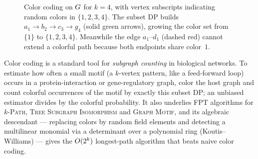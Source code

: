 \begin{figure}[H]
\centering
{}
\caption{Color coding on $G$ for $k=4$, with vertex subscripts indicating random colors in $\{1,2,3,4\}$. The subset DP builds $a_1 \to b_2 \to c_3 \to g_4$ (solid green arrows), growing the color set from $\{1\}$ to $\{1,2,3,4\}$. Meanwhile the edge $a_1\text{--}d_1$ (dashed red) cannot extend a colorful path because both endpoints share color~$1$.}
\label{ch25:fig-color-coding}
\end{figure}

\begin{applicationbox}
Color coding is a standard tool for \emph{subgraph counting} in biological networks. To estimate how often a small motif (a $k$-vertex pattern, like a feed-forward loop) occurs in a protein-interaction or gene-regulatory graph, color the host graph and count colorful occurrences of the motif by exactly this subset DP; an unbiased estimator divides by the colorful probability. It also underlies FPT algorithms for \textsc{$k$-Path}, \textsc{Tree Subgraph Isomorphism} and \textsc{Graph Motif}, and its algebraic descendant --- replacing colors by random field elements and detecting a multilinear monomial via a determinant over a polynomial ring (Koutis--Williams) --- gives the $O(2^k)$ longest-path algorithm that beats naive color coding.
\end{applicationbox}

